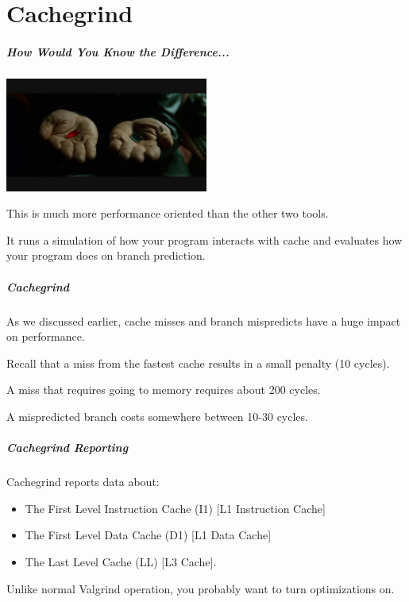 \part{Cachegrind}
\begin{frame}
\partpage
\end{frame}


\begin{frame}
\frametitle{How Would You Know the Difference...}

\begin{center}
	\includegraphics[width=0.5\textwidth]{images/redbluepill.jpg}
\end{center}

This is much more performance oriented than the other two tools. 

 It runs a simulation of how your program interacts with cache and evaluates how your program does on branch prediction.
 

\end{frame}


\begin{frame}
\frametitle{Cachegrind}


 As we discussed earlier, cache misses and branch mispredicts have a huge impact on performance.
 
 Recall that a miss from the fastest cache results in a small penalty (10 cycles).
 
 A miss that requires going to memory requires about 200 cycles. 
 
 A mispredicted branch costs somewhere between 10-30 cycles.


\end{frame}

\begin{frame}
\frametitle{Cachegrind Reporting}

Cachegrind reports data about:
\begin{itemize}
	\item The First Level Instruction Cache (I1) [L1 Instruction Cache]
	\item The First Level Data Cache (D1) [L1 Data Cache]
	\item The Last Level Cache (LL) [L3 Cache].
\end{itemize}

Unlike normal Valgrind operation, you probably want to turn optimizations on.

\end{frame}

